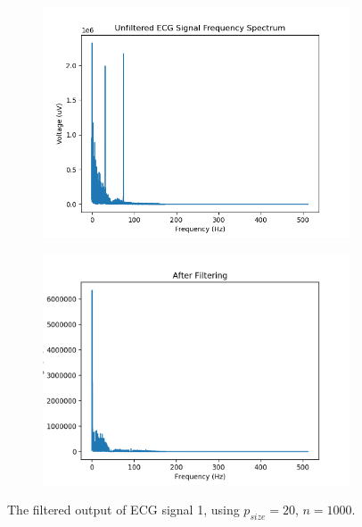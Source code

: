 \documentclass[a4paper, 11pt]{article}
\begin{document}
    \begin{figure}[h!]
        \centering  
        \begin{subfigure}[b]{0.5\linewidth}
            \graphicspath{{./wiki/}}
            \includegraphics[width=\linewidth]{ECG_freq_spectrum.png}
        \end{subfigure}%
        \begin{subfigure}[b]{0.5\linewidth}
            \graphicspath{{./wiki/}}
            \includegraphics[width=\linewidth]{af_filtering_1kGen20Pop.png}
        \end{subfigure}
        \caption{The filtered output of ECG signal 1, using $p_{size} = 20$, $n = 1000$.}
        \label{Fig:result_1}
    \end{figure}
\end{document}
